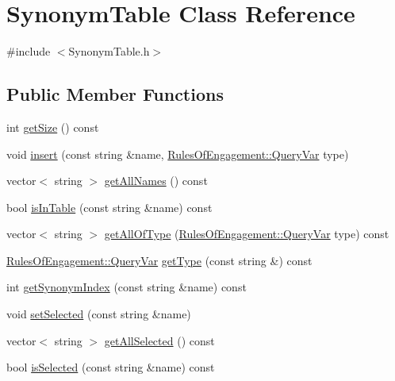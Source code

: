 \hypertarget{class_synonym_table}{\section{Synonym\-Table Class Reference}
\label{class_synonym_table}
}


{\ttfamily \#include $<$Synonym\-Table.\-h$>$}

\subsection*{Public Member Functions}
\begin{DoxyCompactItemize}
\item 
int \hyperlink{class_synonym_table_a4c07332f021c0d969bd913be1bf82bd6}{get\-Size} () const 
\item 
void \hyperlink{class_synonym_table_abda36f6346220b4d99efc9e522f57ac1}{insert} (const string \&name, \hyperlink{class_rules_of_engagement_a5dd2b28fd0c906d9b08e29e371713ead}{Rules\-Of\-Engagement\-::\-Query\-Var} type)
\item 
vector$<$ string $>$ \hyperlink{class_synonym_table_acb150fae4c378832b51b514da7d85bc2}{get\-All\-Names} () const 
\item 
bool \hyperlink{class_synonym_table_aa580c404821e407357fd6cc512504f76}{is\-In\-Table} (const string \&name) const 
\item 
vector$<$ string $>$ \hyperlink{class_synonym_table_ab43bd9f067e43b73afa7c096cb56f07a}{get\-All\-Of\-Type} (\hyperlink{class_rules_of_engagement_a5dd2b28fd0c906d9b08e29e371713ead}{Rules\-Of\-Engagement\-::\-Query\-Var} type) const 
\item 
\hyperlink{class_rules_of_engagement_a5dd2b28fd0c906d9b08e29e371713ead}{Rules\-Of\-Engagement\-::\-Query\-Var} \hyperlink{class_synonym_table_abda3f936a0e70d91ae26470c6a1b902a}{get\-Type} (const string \&) const 
\item 
int \hyperlink{class_synonym_table_a040c55f27a2f9c23aedf6818c40324df}{get\-Synonym\-Index} (const string \&name) const 
\item 
void \hyperlink{class_synonym_table_a57707788e5729fcb3edb8c17d56ea056}{set\-Selected} (const string \&name)
\item 
vector$<$ string $>$ \hyperlink{class_synonym_table_a10082dabe233a4cc136012604fdd0c99}{get\-All\-Selected} () const 
\item 
bool \hyperlink{class_synonym_table_aedd2ee139a4bea5ebff46e0e795b303f}{is\-Selected} (const string \&name) const 

\end{DoxyCompactItemize}
